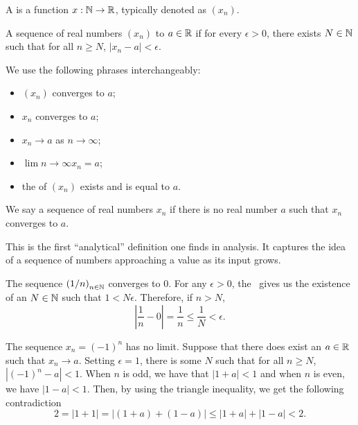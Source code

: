 \begin{definition}
  A  is a function \(x : \mathbb{N} \to \mathbb{R}\), typically denoted as \((x_{n})\).
\end{definition}

\begin{definition}
  A sequence of real numbers \((x_{n})\)  to \(a \in \mathbb{R}\) if for every \(\epsilon > 0\), there exists \(N \in \mathbb{N}\) such that for all \(n \geq N\), \(|x_{n} - a| < \epsilon\).

  We use the following phrases interchangeably:
  \begin{itemize}
    \item \((x_{n})\) converges to \(a\);
    \item \(x_{n}\) converges to \(a\);
    \item \(x_{n} \to a\) as \(n \to \infty\);
    \item \(\lim{n \to \infty}{x_{n}} = a\);
    \item the  of \((x_{n})\) exists and is equal to \(a\).
  \end{itemize}

  We say a sequence of real numbers \(x_{n}\)  if there is no real number \(a\) such that \(x_{n}\) converges to \(a\).
\end{definition}

This is the first ``analytical'' definition one finds in analysis. It captures the idea of a sequence of numbers approaching a value as its input grows.

\begin{example}
  The sequence \({(1/n)}_{n \in \mathbb{N}}\) converges to \(0\). For any \(\epsilon > 0\), the~ gives us the existence of an \(N \in \mathbb{N}\) such that \(1 < N \epsilon\). Therefore, if \(n > N\),
  \[\left|\frac 1 n - 0 \right| = \frac 1 n \leq \frac 1 N < \epsilon.\]
\end{example}

\begin{example}
  The sequence \(x_{n} = {(-1)}^{n}\) has no limit. Suppose that there does exist an \(a \in \mathbb{R}\) such that \(x_{n} \to a\). Setting \(\epsilon = 1\), there is some \(N\) such that for all \(n \geq N\), \(\left| (-1)^{n} - a \right| < 1\). When \(n\) is odd, we have that \(|1 + a| < 1\) and when \(n\) is even, we have \(|1 - a| < 1\). Then, by using the triangle inequality, we get the following contradiction
  \[2 = | 1 + 1 | = | (1 + a) + (1 - a) | \leq |1 + a| + |1 - a| < 2.\]
\end{example}


